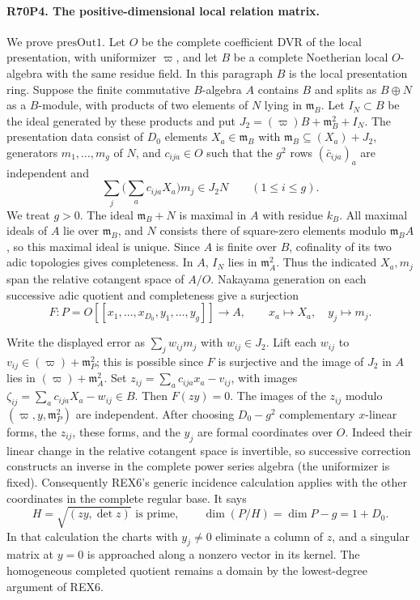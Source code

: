 \paragraph{R70P4. The positive-dimensional local relation matrix.}
We prove $\mathrm{presOut1}$. Let $O$ be the complete coefficient DVR
of the local presentation, with uniformizer $\varpi$, and let
$B$ be a complete Noetherian local $O$-algebra with the same
residue field. In this paragraph $B$ is the local presentation
ring. Suppose the finite commutative $B$-algebra $A$ contains
$B$ and splits as $B\oplus N$ as a $B$-module, with products of
two elements of $N$ lying in $\mathfrak m_B$. Let $I_N\subset B$
be the ideal generated by these products and put
$J_2=(\varpi)B+\mathfrak m_B^2+I_N$. The presentation data
consist of $D_0$ elements $X_a\in\mathfrak m_B$ with
$\mathfrak m_B\subseteq(X_a)+J_2$, generators $m_1,\ldots,m_g$
of $N$, and $c_{ija}\in O$ such that the $g^2$ rows
$(\bar c_{ija})_a$ are independent and
\[
             \sum_j\Big(\sum_a c_{ija}X_a\Big)m_j\in J_2N
             \qquad(1\le i\le g).
\]
We treat $g>0$. The ideal $\mathfrak m_B+N$ is maximal in $A$
with residue $k_B$. All maximal ideals of $A$ lie over
$\mathfrak m_B$, and $N$ consists there of square-zero elements
modulo $\mathfrak m_B A$, so this maximal ideal is unique.
Since $A$ is finite over $B$, cofinality of its two adic
topologies gives completeness. In $A$, $I_N$ lies in
$\mathfrak m_A^2$. Thus the indicated $X_a,m_j$ span the
relative cotangent space of $A/O$. Nakayama generation on each
successive adic quotient and completeness give a surjection
\[
  F:P=O[[x_1,\ldots,x_{D_0},y_1,\ldots,y_g]]\longrightarrow A,
       \qquad x_a\mapsto X_a,\quad y_j\mapsto m_j .
\]

Write the displayed error as $\sum_j w_{ij}m_j$ with $w_{ij}\in J_2$.
Lift each $w_{ij}$ to $v_{ij}\in(\varpi)+\mathfrak m_P^2$;
this is possible since $F$ is surjective and the image of $J_2$ in $A$
lies in $(\varpi)+\mathfrak m_A^2$.
Set $z_{ij}=\sum_a c_{ija}x_a-v_{ij}$, with images
$\zeta_{ij}=\sum_a c_{ija}X_a-w_{ij}\in B$.
Then $F(zy)=0$. The images of the $z_{ij}$ modulo
$(\varpi,y,\mathfrak m_P^2)$ are independent.
After choosing $D_0-g^2$ complementary $x$-linear forms, the
$z_{ij}$, these forms, and the $y_j$ are formal coordinates
over $O$. Indeed their linear change in the relative cotangent
space is invertible, so successive correction constructs an inverse
in the complete power series algebra (the uniformizer is fixed).
Consequently REX6's generic incidence calculation applies with
the other coordinates in the complete regular base. It says
\[
 H=\sqrt{(zy,\det z)}\text{ is prime},\qquad
              \dim(P/H)=\dim P-g=1+D_0 .
\]
In that calculation the charts with $y_j\ne0$ eliminate a
column of $z$, and a singular matrix at $y=0$ is approached
along a nonzero vector in its kernel. The homogeneous completed
quotient remains a domain by the lowest-degree argument of REX6.

